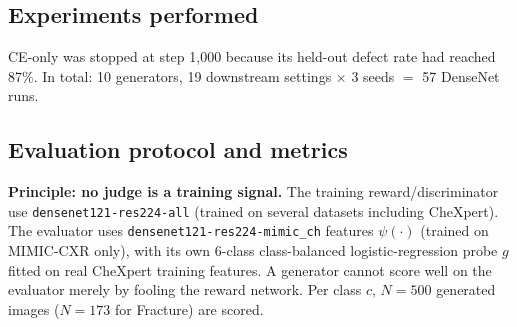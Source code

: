\documentclass[twoside,english]{article}
\begin{document}
\subsection{Experiments performed}
\begin{table}[!htbp]
\centering\small
\caption{LoRA generator variants (all continue from the P-Rajiv unet\_clip LoRA). ``Selected step'' = chosen by held-out checkpoint selection (Sec.~\ref{sec:ckpt}).}\label{tab:runs}
\end{table}
CE-only was stopped at step 1{,}000 because its held-out defect rate had reached 87\%. In total: 10 generators, 19 downstream settings $\times$ 3 seeds $=$ 57 DenseNet runs.

\subsection{Evaluation protocol and metrics}\label{sec:evalmetrics}
\textbf{Principle: no judge is a training signal.} The training reward/discriminator use \texttt{densenet121-res224-all} (trained on several datasets including CheXpert). The evaluator uses \texttt{densenet121-res224-mimic\_ch} features $\psi(\cdot)$ (trained on MIMIC-CXR only), with its own 6-class class-balanced logistic-regression probe $g$ fitted on real CheXpert training features. A generator cannot score well on the evaluator merely by fooling the reward network. Per class $c$, $N=500$ generated images ($N=173$ for Fracture) are scored.
\end{document}

